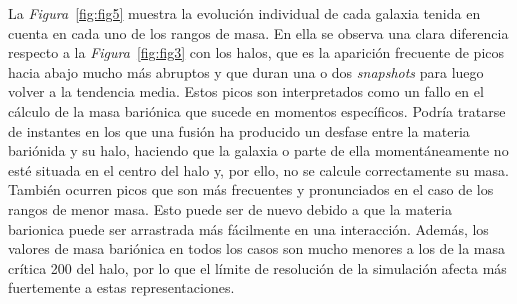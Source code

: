 La \textit{Figura}~\ref{fig:fig5} muestra la evolución individual de cada galaxia tenida en cuenta en cada uno de los rangos de masa. En ella se observa una clara diferencia respecto a la \textit{Figura}~\ref{fig:fig3} con los halos, que es la aparición frecuente de picos hacia abajo mucho más abruptos y que duran una o dos \textit{snapshots} para luego volver a la tendencia media. Estos picos son interpretados como un fallo en el cálculo de la masa bariónica que sucede en momentos específicos. Podría tratarse de instantes en los que una fusión ha producido un desfase entre la materia bariónida y su halo, haciendo que la galaxia o parte de ella momentáneamente no esté situada en el centro del halo y, por ello, no se calcule correctamente su masa. También ocurren picos que son más frecuentes y pronunciados en el caso de los rangos de menor masa. Esto puede ser de nuevo debido a que la materia barionica puede ser arrastrada más fácilmente en una interacción. Además, los valores de masa bariónica en todos los casos son mucho menores a los de la masa crítica 200 del halo, por lo que el límite de resolución de la simulación afecta más fuertemente a estas representaciones. \\

